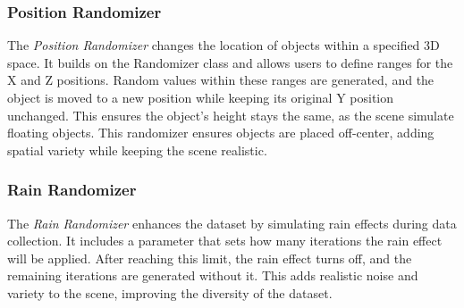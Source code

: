 \subsubsection{Position Randomizer}
The \textit{Position Randomizer} changes the location of objects within a specified 3D space. It builds on the Randomizer class and allows users to define ranges for the X and Z positions. Random values within these ranges are generated, and the object is moved to a new position while keeping its original Y position unchanged. This ensures the object's height stays the same, as the scene simulate floating objects. This randomizer ensures objects are placed off-center, adding spatial variety while keeping the scene realistic.

\subsubsection{Rain Randomizer}
The \textit{Rain Randomizer} enhances the dataset by simulating rain effects during data collection. It includes a parameter that sets how many iterations the rain effect will be applied. After reaching this limit, the rain effect turns off, and the remaining iterations are generated without it. This adds realistic noise and variety to the scene, improving the diversity of the dataset.

